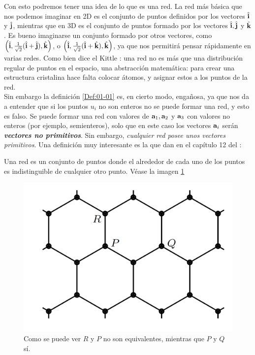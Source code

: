 Con esto podremos tener una idea de lo que es una red. La red más básica que nos podemos imaginar en 2D es el conjunto de puntos definidos por los vectores $\hat{\mathbf{i}}$ y $\hat{\mathbf{j}}$, mientras que en 3D es el conjunto de puntos formado por los vectores $\hat{\mathbf{i}},\hat{\mathbf{j}}$ y $\hat{\mathbf{k}}$. Es bueno imaginarse un conjunto formado por otros vectores, como $\left( \hat{\mathbf{i}},\frac{1}{\sqrt{2}} (\hat{\mathbf{i}} +\hat{\mathbf{j}}),\hat{\mathbf{k}} \right)$, o $\left( \hat{\mathbf{i}},\frac{1}{\sqrt{2}} (\hat{\mathbf{i}} +\hat{\mathbf{k}}),\hat{\mathbf{k}} \right)$, ya que nos permitirá pensar rápidamente en varias redes. Como bien dice el Kittle \cite{Estado_Solido_Kittel}:  una red no es más que una distribución regular de puntos en el espacio, una abstracción matemática: para crear una estructura cristalina hace falta colocar átomos, y asignar estos a los puntos de la red. \\

Sin embargo la definición \ref{Def:01-01} es, en cierto modo, engañosa, ya que nos da a entender que si los puntos $u_i$ no son enteros no se puede formar una red, y esto es falso. Se puede formar una red con valores de $\mathbf{a}_1,\mathbf{a}_2$ y $\mathbf{a}_3$ con valores no enteros (por ejemplo, semienteros), solo que en este caso los vectores $\mathbf{a}_i$ serán \textit{\textbf{vectores no primitivos}}. Sin embargo, \textit{cualquier red posee unos vectores primitivos}. Una definición muy interesante es la que dan en el capítulo 12 del \cite{Oxford_Solid_State}:

\begin{definition_equivalente}
	Una red es un conjunto de puntos donde el alrededor de cada uno de los puntos es indistinguible de cualquier otro punto. Véase la imagen \ref{Fig:01-00}
\end{definition_equivalente}

\begin{figure}[h!] \centering
	\includegraphics[scale=0.3]{Cuerpo/Ch_01/red.png}
	\caption{Como se puede ver $R$ y $P$ no son equivalentes, mientras que $P$ y $Q$ sí.}
	\label{Fig:01-00}
\end{figure}


